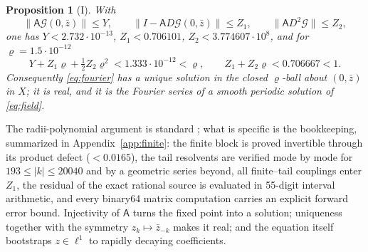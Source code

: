 \documentclass[11pt,a4paper]{article}
\theoremstyle{plain}
\newtheorem{proposition}[theorem]{Proposition}
\theoremstyle{definition}
\theoremstyle{remark}
\newcommand{\norm}[1]{\lVert#1\rVert}
\newcommand{\abs}[1]{\lvert#1\rvert}
\newcommand{\evI}{\textsf{I}}
\begin{document}
\begin{proposition}[\evI]\label{prop:fourier}
With
\[
\norm{\mathsf A\mathcal G(0,\bar z)}\le Y,\qquad \norm{I-\mathsf AD\mathcal G(0,\bar z)}\le Z_1,\qquad \norm{\mathsf AD^2\mathcal G}\le Z_2,
\]
one has $Y<2.732\cdot10^{-13}$, $Z_1<0.706101$, $Z_2<3.774607\cdot10^{8}$, and for $\varrho=1.5\cdot10^{-12}$
\[
Y+Z_1\varrho+\tfrac12Z_2\varrho^2<1.333\cdot10^{-12}<\varrho,\qquad Z_1+Z_2\varrho<0.706667<1 .
\]
Consequently \eqref{eq:fourier} has a unique solution in the closed $\varrho$-ball about $(0,\bar z)$ in $X$; it is real, and it is the Fourier series of a smooth periodic solution of \eqref{eq:field}.
\end{proposition}
The radii-polynomial argument is standard \cite{DayLessardMischaikow07,vandenBergLessard15}; what is specific is the bookkeeping, summarized in Appendix~\ref{app:finite}: the finite block is proved invertible through its product defect ($<0.0165$), the tail resolvents are verified mode by mode for $193\le\abs k\le20040$ and by a geometric series beyond, all finite--tail couplings enter $Z_1$, the residual of the exact rational source is evaluated in 55-digit interval arithmetic, and every binary64 matrix computation carries an explicit forward error bound. Injectivity of $\mathsf A$ turns the fixed point into a solution; uniqueness together with the symmetry $z_k\mapsto\bar z_{-k}$ makes it real; and the equation itself bootstraps $z\in\ell^1$ to rapidly decaying coefficients.
\end{document}
